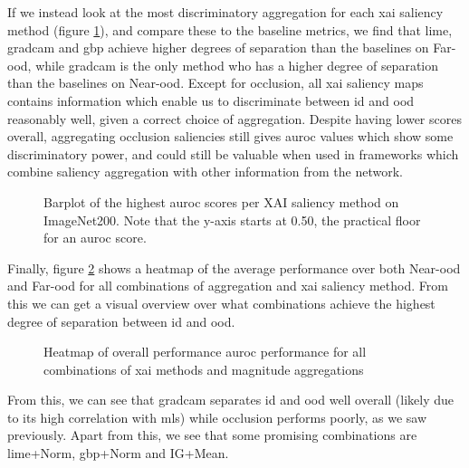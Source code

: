 \documentclass[UKenglish]{uiomasterthesis} %
\theoremstyle{definition}
\begin{document}
If we instead look at the most discriminatory aggregation for each \ac{xai} saliency method (figure \ref{fig:imagenet200_all_generators_barplot}), and compare these to the baseline metrics, we find that \ac{lime}, \ac{gradcam} and \ac{gbp} achieve higher degrees of separation than the baselines on Far-\ac{ood}, while \ac{gradcam} is the only method who has a higher degree of separation than the baselines on Near-\ac{ood}. Except for occlusion, all \ac{xai} saliency maps contains information which enable us to discriminate between \ac{id} and \ac{ood} reasonably well, given a correct choice of aggregation. Despite having lower scores overall, aggregating occlusion saliencies still gives \ac{auroc} values which show some discriminatory power, and could still be valuable when used in frameworks which combine saliency aggregation with other information from the network.

\begin{figure}[hbtp]
    \begin{center}
        
    \end{center}
    \caption[Highest AUROC score for each XAI saliency method on ImageNet200]{Barplot of the highest \ac{auroc} scores per XAI saliency method on ImageNet200. Note that the y-axis starts at 0.50, the practical floor for an \ac{auroc} score.}
    \label{fig:imagenet200_all_generators_barplot}
\end{figure}

Finally, figure \ref{fig:imagenet200_heatmap} shows a heatmap of the average performance over both Near-\ac{ood} and Far-\ac{ood} for all combinations of aggregation and \ac{xai} saliency method. From this we can get a visual overview over what combinations achieve the highest degree of separation between \ac{id} and \ac{ood}.

\begin{figure}[hbtp]
    \begin{center}
        
    \end{center}
    \caption[Overall performance on ImageNet200]{Heatmap of overall performance \ac{auroc} performance for all combinations of \ac{xai} methods and magnitude aggregations}
    \label{fig:imagenet200_heatmap}
\end{figure}

From this, we can see that \ac{gradcam} separates \ac{id} and \ac{ood} well overall (likely due to its high correlation with \ac{mls}) while occlusion performs poorly, as we saw previously. Apart from this, we see that some promising combinations are \ac{lime}+Norm, \ac{gbp}+Norm and IG+Mean.
\end{document}
